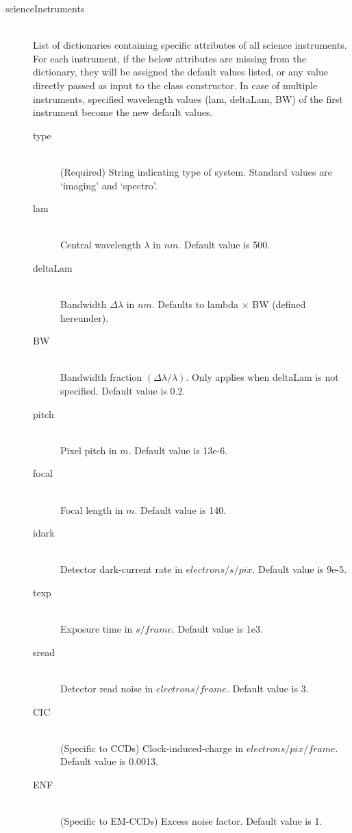 \documentclass[cleanfoot]{asme2ej}
\begin{document}
\begin{itemize}
\begin{description}
    \item[scienceInstruments] \hfill\\ List of dictionaries containing specific attributes of all science instruments. For each instrument, if the below attributes are missing from the dictionary, they will be assigned the default values listed, or any value directly passed as input to the class constructor. In case of multiple instruments, specified wavelength values (lam, deltaLam, BW) of the first instrument become the new default values.
    \begin{description}
    \item[type] \hfill\\ (Required) String indicating type of system.  Standard values are `imaging' and `spectro'.
    \item[lam] \hfill \\
    Central wavelength $\lambda$ in $ nm $. Default value is 500. 
    \item[deltaLam] \hfill \\
    Bandwidth $ \Delta\lambda $ in $ nm $. Defaults to lambda $ \times $ BW (defined hereunder).
    \item[BW] \hfill \\ Bandwidth fraction $(\Delta\lambda/\lambda)$. Only applies when deltaLam is not specified. Default value is 0.2.
    \item[pitch] \hfill \\
    Pixel pitch in $ m $. Default value is 13e-6. 
    \item[focal] \hfill \\
    Focal length in $ m $. Default value is 140. 
    \item[idark] \hfill \\
    Detector dark-current rate in $ electrons /s /pix $. Default value is 9e-5. 
    \item[texp] \hfill \\
    Exposure time in $ s/frame $. Default value is 1e3. 
    \item[sread] \hfill \\
    Detector read noise in $ electrons/frame $. Default value is 3. 
    \item[CIC] \hfill \\
    (Specific to CCDs) Clock-induced-charge in $ electrons/pix/frame $. Default value is 0.0013. 
    \item[ENF] \hfill \\
    (Specific to EM-CCDs) Excess noise factor. Default value is 1. 

\end{description}
\end{description}
\end{itemize}
\end{document}

